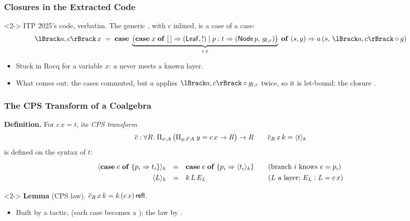 \begin{frame*}[vertical-alignment = top]
  \frametitle{Closures in the Extracted Code}
  \vspace*{3mm}
  \begin{uncoverenv}<2->
    ITP 2025's code, verbatim. The generic , with $c$
    inlined, is a case of a case:
    \[
      \hylo{a}{c}\,x \;=\; \mathbf{case}\;
        \underbrace{\bigl(\mathbf{case}\;x\;\mathbf{of}\;
          [\,] \Rightarrow (\op{Leaf}, !) \mid p : t \Rightarrow
          (\op{Node}\,p,\, g_{l,r})\bigr)}_{c\,x}
        \;\mathbf{of}\;(s, g) \Rightarrow a\,(s,\, \hylo{a}{c} \circ g)
    \]
  \end{uncoverenv}
  \begin{itemize}
    \item<3-> Stuck in Rocq for a variable $x$: $a$ never meets a known
      layer.
    \item<4-> What comes out: the cases commuted, but $a$ applies
      $\hylo{a}{c} \circ g_{l,r}$ twice, so it is let-bound: the closure
      .
  \end{itemize}
\end{frame*}

\begin{frame}[vertical-alignment = top]
  \frametitle{The CPS Transform of a Coalgebra}
  \vspace*{4mm}
  \textbf{Definition.} For $c\,x = t$, its \emph{CPS transform}
  \[ \overline{c} : \forall R.\; \Pi_{x : A}\, \bigl(\Pi_{y : F A}\; y = c\,x
     \to R\bigr) \to R
     \qquad \overline{c}_R\,x\,k = \langle t \rangle_k \]
  is defined on the syntax of $t$:
  \[
    \renewcommand\arraystretch{1.3}
    \begin{array}{rcl@{\qquad}l}
      \langle \mathbf{case}\;e\;\mathbf{of}\;\{p_i \Rightarrow t_i\}
        \rangle_k & = & \mathbf{case}\;e\;\mathbf{of}\;\{p_i \Rightarrow
        \langle t_i \rangle_k\} & \text{(branch $i$ knows $e = p_i$)} \\
      \langle L \rangle_k & = & k\,L\,E_L & \text{($L$ a layer; $E_L :
        L = c\,x$)}
    \end{array}
  \]
  \begin{uncoverenv}<2->
    \textbf{Lemma} (CPS law). $\overline{c}_R\,x\,k = k\,(c\,x)\,\mathsf{refl}$.
  \end{uncoverenv}
  \begin{itemize}
    \item<3-> Built by a tactic,  (each case becomes
      a ); the law by .
  \end{itemize}
\end{frame}

